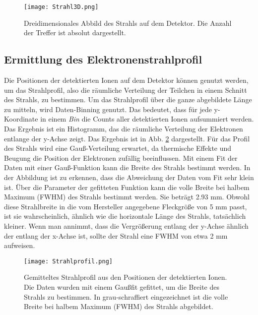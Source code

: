 \begin{figure}
    \centering
    \texttt{[image: Strahl3D.png]}
    \caption[Dreidimensionales Abbild des Strahls auf dem Detektor]{Dreidimensionales Abbild des Strahls auf dem Detektor. Die Anzahl der Treffer ist absolut dargestellt.}
    \label{fig:Strahl3D} 
\end{figure}

\subsection{Ermittlung des Elektronenstrahlprofil}
Die Positionen der detektierten Ionen auf dem Detektor können genutzt werden, um das Strahlprofil, also die räumliche Verteilung der Teilchen in einem Schnitt des Strahls, zu bestimmen. Um das Strahlprofil über die ganze abgebildete Länge zu mitteln, wird Daten-Binning genutzt. Das bedeutet, dass für jede y-Koordinate in einem \textit{Bin} die Counts aller detektierten Ionen aufsummiert werden. Das Ergebnis ist ein Histogramm, das die räumliche Verteilung der Elektronen entlange der y-Achse zeigt. Das Ergebnis ist in Abb. \ref{fig:Strahlprofil} dargestellt. Für das Profil des Strahls wird eine Gauß-Verteilung erwartet, da thermische Effekte und Beugung die Position der Elektronen zufällig beeinflussen. Mit einem Fit der Daten mit einer Gauß-Funktion kann die Breite des Strahls bestimmt werden. In der Abbildung ist zu erkennen, dass die Abweichung der Daten vom Fit sehr klein ist. Über die Parameter der gefitteten Funktion kann die volle Breite bei halbem Maximum (FWHM) des Strahls bestimmt werden. Sie beträgt 2.93 mm. Obwohl diese Strahlbreite in die vom Hersteller angegebene Fleckgröße von 5 mm passt, ist sie wahrscheinlich, ähnlich wie die horizontale Länge des Strahls, tatsächlich kleiner. Wenn man annimmt, dass die Vergrößerung entlang der y-Achse ähnlich der entlang der x-Achse ist, sollte der Strahl eine FWHM von etwa 2 mm aufweisen.

\begin{figure}
    \centering
    \texttt{[image: Strahlprofil.png]}
    \caption[Gemitteltes Strahlprofil]{Gemitteltes Strahlprofil aus den Positionen der detektierten Ionen. Die Daten wurden mit einem Gaußfit gefittet, um die Breite des Strahls zu bestimmen. In grau-schraffiert eingezeichnet ist die volle Breite bei halbem Maximum (FWHM) des Strahls abgebildet.}
    \label{fig:Strahlprofil} 
\end{figure}
